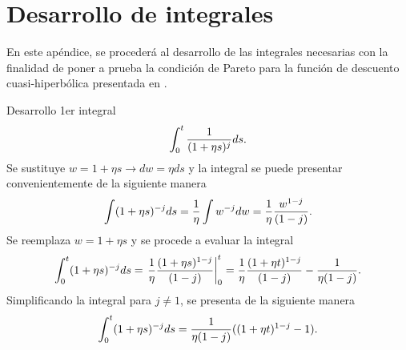 \chapter{Desarrollo de integrales}\label{Apendice_G}

En este apéndice, se procederá al desarrollo de las integrales necesarias con la finalidad de poner a prueba la condición de Pareto para la función de descuento cuasi-hiperbólica presentada en \parencite{myerson1995discounting}.

\begin{lem}{Desarrollo 1er integral}
$$\displaystyle \int_0^{t} \dfrac{1}{(1+\eta s)^j} ds.$$
%
Se sustituye $w=1+\eta s \rightarrow dw=\eta ds$ y la integral se puede presentar convenientemente de la siguiente manera
$$\displaystyle \int (1+\eta s)^{-j} ds=\displaystyle \dfrac{1}{\eta}\int  w^{-j} dw=\dfrac{1}{\eta} \dfrac{w^{1-j}}{(1-j)}.$$
Se reemplaza $w=1+\eta s$ y se procede a evaluar la integral
$$\displaystyle \int_0^t (1+\eta s)^{-j} ds=\left.\dfrac{1}{\eta} \dfrac{(1+\eta s)^{1-j}}{(1-j)}\right|_0^t=\dfrac{1}{\eta} \dfrac{(1+\eta t)^{1-j}}{(1-j)}-\dfrac{1}{\eta(1-j)}. $$
Simplificando la integral para $j\ne 1$, se presenta de la siguiente manera 
$$\displaystyle \int_0^t (1+\eta s)^{-j} ds=\dfrac{1}{\eta(1-j)}((1+\eta t)^{1-j}-1).$$
\end{lem}

